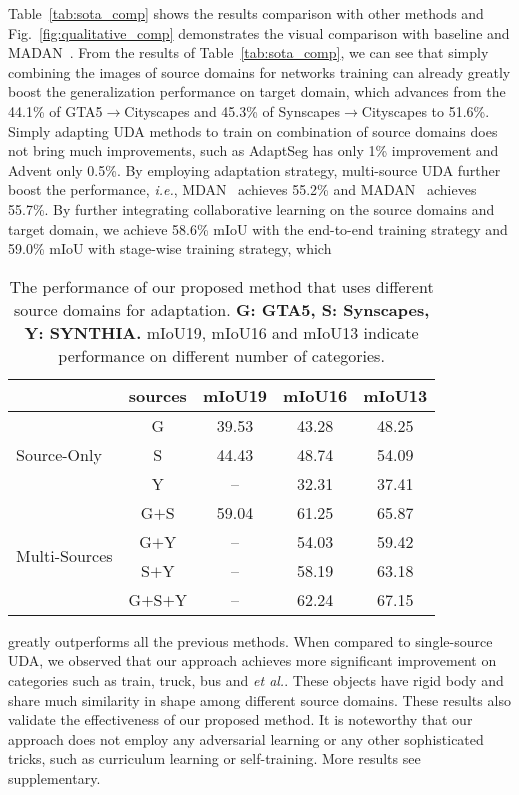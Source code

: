 \documentclass[final]{cvpr}
\def\etal{\textit{et al.}}
\def\ie{\textit{i.e.}}
\begin{document}
Table~\ref{tab:sota_comp} shows the results comparison with other methods and Fig.~\ref{fig:qualitative_comp} demonstrates the visual comparison with baseline and MADAN~\cite{zhao2019multi}.
From the results of Table~\ref{tab:sota_comp}, we can see that simply combining the images of source domains for networks training can already greatly boost the generalization performance on target domain, which advances from the 44.1\% of GTA5$\rightarrow$Cityscapes and 45.3\% of Synscapes$\rightarrow$Cityscapes to 51.6\%. Simply adapting UDA methods to train on combination of source domains does not bring much improvements, such as AdaptSeg has only 1\% improvement and Advent only 0.5\%. By employing adaptation strategy, multi-source UDA further boost the performance, \ie, MDAN~\cite{zhao2018adversarial} achieves 55.2\% and MADAN~\cite{zhao2019multi} achieves 55.7\%. By further integrating collaborative learning on the source domains and target domain, we achieve 58.6\% mIoU with the end-to-end training strategy and 59.0\% mIoU with stage-wise training strategy, which
\begin{table}[t]
	\centering
	\caption{The performance of our proposed method that uses different source domains for adaptation. \textbf{G: GTA5, S: Synscapes, Y: SYNTHIA.} mIoU19, mIoU16 and mIoU13 indicate performance on different number of categories.}
	\label{tab:multi-source}
	\vspace{1mm}
	\setlength{\tabcolsep}{1.2mm}
	\begin{tabular}{l|c|ccc}
		\hline
		& sources & mIoU19 & mIoU16 & mIoU13 \\
		\hline
		\multirow{3}{*}{Source-Only} & G & 39.53 & 43.28 & 48.25 \\
		& S & 44.43 & 48.74 & 54.09 \\
		& Y & -- & 32.31 & 37.41 \\
		\hline
		\multirow{4}{*}{Multi-Sources} & G$+$S & 59.04 & 61.25 & 65.87 \\
		& G$+$Y & -- &  54.03 & 59.42\\
		& S$+$Y & -- & 58.19 & 63.18 \\
		& G$+$S$+$Y & -- & 62.24 & 67.15  \\
		\hline
	\end{tabular}
	\vspace{-8pt}
\end{table}
greatly outperforms all the previous methods. When compared to single-source UDA, we observed that our approach achieves more significant improvement on categories such as train, truck, bus and \etal. These objects have rigid body and share much similarity in shape among different source domains. These results also validate the effectiveness of our proposed method. It is noteworthy that our approach does not employ any adversarial learning or any other sophisticated tricks, such as curriculum learning or self-training. More results see supplementary.
\end{document}
